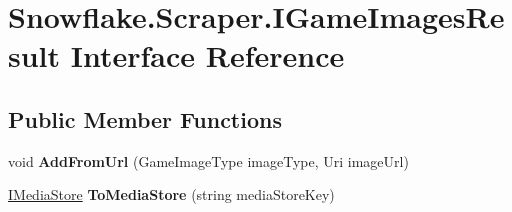 \hypertarget{interface_snowflake_1_1_scraper_1_1_i_game_images_result}{}\section{Snowflake.\+Scraper.\+I\+Game\+Images\+Result Interface Reference}
\label{interface_snowflake_1_1_scraper_1_1_i_game_images_result}
\subsection*{Public Member Functions}
\begin{DoxyCompactItemize}
\item 
\hypertarget{interface_snowflake_1_1_scraper_1_1_i_game_images_result_adf40922df33f6064d2eda4ec51956c54}{}void {\bfseries Add\+From\+Url} (Game\+Image\+Type image\+Type, Uri image\+Url)\label{interface_snowflake_1_1_scraper_1_1_i_game_images_result_adf40922df33f6064d2eda4ec51956c54}

\item 
\hypertarget{interface_snowflake_1_1_scraper_1_1_i_game_images_result_affeeec97c8d5228b7d05b1bcae9761d0}{}\hyperlink{interface_snowflake_1_1_information_1_1_media_store_1_1_i_media_store}{I\+Media\+Store} {\bfseries To\+Media\+Store} (string media\+Store\+Key)\label{interface_snowflake_1_1_scraper_1_1_i_game_images_result_affeeec97c8d5228b7d05b1bcae9761d0}

\end{DoxyCompactItemize}
